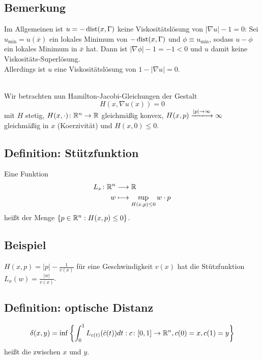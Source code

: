 \subsection{Bemerkung}
\label{bem_24}
	Im Allgemeinen ist $u  = -\operatorname{dist}(x,\Gamma)$ \marginnote{[24]} keine Viskositätslösung von $|\nabla u|-1 = 0$: Sei $u_{\min} = u(\overline{x})$ ein lokales Minimum von $-\operatorname{dist}(x,\Gamma)$ und $\phi \equiv u_{\min}$, sodass $u  -\phi$ ein lokales Minimum in $\overline{x}$ hat. Dann ist $|\nabla \phi| - 1 = -1 < 0$ und $u$ damit keine Viskositäts-Superlösung. \\
	Allerdings ist $u$ eine Viskositätslösung von $1-|\nabla u| = 0$.
	
	\mbox{} \\
	Wir betrachten nun Hamilton-Jacobi-Gleichungen der Gestalt
	\begin{equation}
		H(x,\nabla u(x)) = 0 \label{eq_0605_18} 
	\end{equation}
	mit $H$ stetig, $H(x,\cdot)\colon \mathbb{R}^n \rightarrow \mathbb{R}$ gleichmäßig konvex, $H(x,p) \xlongrightarrow{|p| \rightarrow \infty} \infty$ gleichmäßig in $x$ (Koerzivität) und $H(x,0) \leq 0$.
	
\subsection{Definition: Stützfunktion}
\label{def_25}
	Eine Funktion \marginnote{[25]}
	\begin{equation}
	\begin{aligned}
		L_x\colon \mathbb{R}^n &\longrightarrow \mathbb{R} \\ \notag
		w &\longmapsto \sup_{H(x,p) \leq 0} w \cdot p
	\end{aligned}
	\end{equation}
	heißt  der Menge $\{p \in \mathbb{R}^n : H(x,p) \leq 0\}$.
	
\subsection{Beispiel}
\label{bsp_26}
	$H(x,p) = |p| - \frac{1}{v(x)}$ für eine Geschwindigkeit $v(x)$ hat die Stützfunktion $L_x(w) = \frac{|w|}{v(x)}$. \marginnote{[26]}
	
\subsection{Definition: optische Distanz}
\label{def_27}
	\[ \delta(x,y) = \inf \left\{ \int_{0}^{1} L_{c(t)}(\dot{c}(t)) dt : c\colon [0,1] \rightarrow \mathbb{R}^n, c(0) = x, c(1) = y\right\} \]
	heißt die  zwischen $x$ und $y$. \marginnote{[27]}
	
